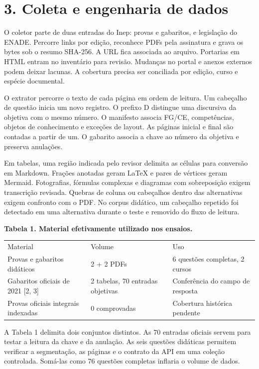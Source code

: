 \documentclass[12pt,a4paper]{article}
\begin{document}
\clearpage
\section*{3. Coleta e engenharia de dados}
O coletor parte de duas entradas do Inep: provas e gabaritos, e legislação do ENADE. Percorre links por edição, reconhece PDFs pela assinatura e grava os bytes sob o resumo SHA-256. A URL fica associada ao arquivo. Portarias em HTML entram no inventário para revisão. Mudanças no portal e anexos externos podem deixar lacunas. A cobertura precisa ser conciliada por edição, curso e espécie documental.

O extrator percorre o texto de cada página em ordem de leitura. Um cabeçalho de questão inicia um novo registro. O prefixo D distingue uma discursiva da objetiva com o mesmo número. O manifesto associa FG/CE, competências, objetos de conhecimento e exceções de layout. As páginas inicial e final são contadas a partir de um. O gabarito associa a chave ao número da objetiva e preserva anulações.

Em tabelas, uma região indicada pelo revisor delimita as células para conversão em Markdown. Frações anotadas geram LaTeX e pares de vértices geram Mermaid. Fotografias, fórmulas complexas e diagramas com sobreposição exigem transcrição revisada. Quebras de coluna ou cabeçalhos dentro das alternativas exigem confronto com o PDF. No corpus didático, um cabeçalho repetido foi detectado em uma alternativa durante o teste e removido do fluxo de leitura.

\begin{center}\small\textbf{Tabela 1. Material efetivamente utilizado nos ensaios.}\par
\begin{tabularx}{\linewidth}{XXX}\toprule
Material & Volume & Uso \\
Provas e gabaritos didáticos & 2 + 2 PDFs & 6 questões completas, 2 cursos \\
Gabaritos oficiais de 2021 [2, 3] & 2 tabelas, 70 entradas objetivas & Conferência do campo de resposta \\
Provas oficiais integrais indexadas & 0 comprovadas & Cobertura histórica pendente \\
\bottomrule\end{tabularx}\end{center}
A Tabela 1 delimita dois conjuntos distintos. As 70 entradas oficiais servem para testar a leitura da chave e da anulação. As seis questões didáticas permitem verificar a segmentação, as páginas e o contrato da API em uma coleção controlada. Somá-las como 76 questões completas inflaria o volume de dados.
\end{document}
